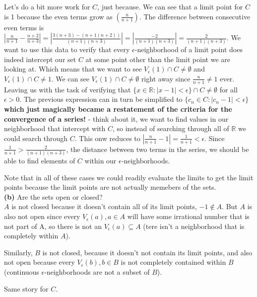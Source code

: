Let's do a bit more work for $C$, just because.
We can see that a limit point for $C$ is 1 because the even terms grow as $(\frac{n}{n+1})$.
The difference between consecutive even terms is
$\left|\frac{n}{n+1} - \frac{n+2}{n+3}\right| = \left|\frac{3(n+3) - (n+1(n+2))}{(n+1)(n+3)}\right| = \left|\frac{-2}{(n+1)(n+3)}\right| = \frac{2}{(n+1)(n+3)}$.
We want to use this data to verify that every $\epsilon$-neighborhood of a limit point does indeed intercept our set $C$
at some point other than the limit point we are looking at.
Which means that we want to see $V_{\epsilon} (1) \cap C \neq \emptyset$ and $V_{\epsilon} (1) \cap C \neq 1$.
We can see $V_{\epsilon} (1) \cap C \neq \emptyset$ right away since $\frac{n}{n+1} \neq 1$ ever.
Leaving us with the task of verifying that $\{ x\in\mathbb{R} : |x-1| < \epsilon \} \cap C \neq \emptyset$ for all $\epsilon > 0$.
The previous expression can in turn be simplified to $\{ c_n\in C : |c_n - 1| < \epsilon \}$
\textbf{which just magically became a restatement of the criteria for the convergence of a series!} -
think about it, we want to find values in our neighborhood that intercept with $C$, so instead of searching through all of $\mathbb{R}$
we could search through $C$.
This onw reduces to $\left| \frac{n}{n+1} - 1 \right| = \frac{1}{n+1} < \epsilon$.
Since $ \frac{1}{n+1} > \frac{2}{(n+1)(n+3)}$, the distance between two terms in the series, we should be able to
find elements of $C$ within our $\epsilon$-neighborhoods.

Note that in all of these cases we could readily evaluate the limits to get the limit points because the limit points
are not actually memebers of the sets.
\\


\textbf{(b)} Are the sets open or closed?
\\

$A$ is not closed because it doesn't contain all of its limit points, $-1 \notin A$.
But $A$ is also not open since every $V_\epsilon (a), a\in A$ will have some irrational number that is not part of A,
so there is not an $V_{\epsilon} (a) \subseteq A$ (tere isn't a neighborhood that is completely within $A$).

Similarly, $B$ is not closed, because it doesn't not contain its limit points, and also not open
because every $V_\epsilon (b), b\in B$ is not completely contained within $B$
(continuous $\epsilon$-neighborhoods are not a subset of $B$).

Same story for $C$.
\\


